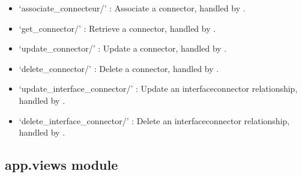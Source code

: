 \documentclass[letterpaper,10pt,english]{sphinxmanual}
\begin{document}
\begin{description}
\begin{itemize}
\item {} 
\sphinxAtStartPar
‘associate\_connecteur/’ : Associate a connector, handled by .

\item {} 
\sphinxAtStartPar
‘get\_connector/’ : Retrieve a connector, handled by .

\item {} 
\sphinxAtStartPar
‘update\_connector/’ : Update a connector, handled by .

\item {} 
\sphinxAtStartPar
‘delete\_connector/’ : Delete a connector, handled by .

\item {} 
\sphinxAtStartPar
‘update\_interface\_connector/’ : Update an interface\sphinxhyphen{}connector relationship, handled by .

\item {} 
\sphinxAtStartPar
‘delete\_interface\_connector/’ : Delete an interface\sphinxhyphen{}connector relationship, handled by .

\end{itemize}

\end{description}


\subsection{app.views module}
\label{\detokenize{app:module-app.views}}\label{\detokenize{app:app-views-module}}
\end{document}
